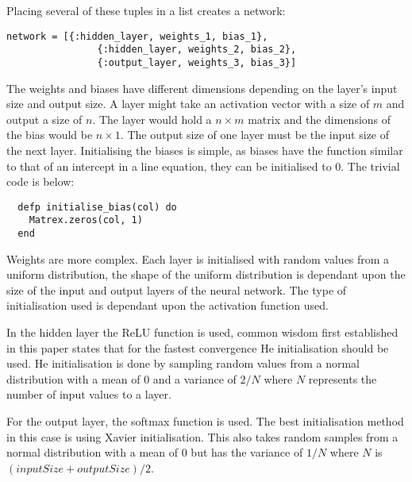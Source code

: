 Placing several of these tuples in a list creates a network:
\begin{lstlisting}[numbers=none,frame=none]
  network = [{:hidden_layer, weights_1, bias_1},
                {:hidden_layer, weights_2, bias_2},
                {:output_layer, weights_3, bias_3}]
\end{lstlisting}

The weights and biases have different dimensions depending on the layer's input
size and output size. A layer might take an activation vector with a size of
\(m\) and output a size of \(n\). The layer would hold a \(n \times m\) matrix
and the dimensions of the bias would be \(n \times 1\). The output size of one
layer must be the input size of the next layer. Initialising the biases is
simple, as biases have the function similar to that of an intercept in a line
equation, they can be initialised to 0. The trivial code is below:
\begin{lstlisting}
  defp initialise_bias(col) do
    Matrex.zeros(col, 1)
  end
\end{lstlisting} 
Weights are more complex. Each layer is initialised with random values from a
uniform distribution, the shape of the uniform distribution is dependant upon
the size of the input and output layers of the neural network. The type of
initialisation used is dependant upon the activation function used.

In the hidden layer the ReLU function is used, common wisdom first established
in this paper \cite{he2015delving} states that for the fastest convergence He
initialisation should be used. He initialisation is done by sampling random
values from a normal distribution with a mean of 0 and a variance of \( 2/N \)
where \(N\) represents the number of input values to a layer.

For the output layer, the softmax function is used. The best initialisation
method in this case is using Xavier
initialisation. \cite{glorot2010understanding} This also takes random samples
from a normal distribution with a mean of 0 but has the variance of \( 1/N \)
where \(N\) is \( (inputSize + outputSize) / 2 \).

